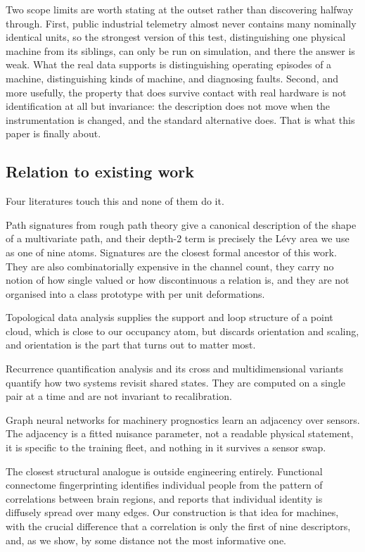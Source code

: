 \documentclass[11pt]{article}
\begin{document}
Two scope limits are worth stating at the outset rather than discovering
halfway through. First, public industrial telemetry almost never contains many
nominally identical units, so the strongest version of this test, distinguishing
one physical machine from its siblings, can only be run on simulation, and there
the answer is weak. What the real data supports is distinguishing operating
episodes of a machine, distinguishing kinds of machine, and diagnosing faults.
Second, and more usefully, the property that does survive contact with real
hardware is not identification at all but invariance: the description does not
move when the instrumentation is changed, and the standard alternative does.
That is what this paper is finally about.

\subsection{Relation to existing work}

Four literatures touch this and none of them do it.

Path signatures from rough path theory give a canonical description of the
shape of a multivariate path, and their depth-2 term is precisely the L\'evy
area we use as one of nine atoms. Signatures are the closest formal ancestor
of this work. They are also combinatorially expensive in the channel count,
they carry no notion of how single valued or how discontinuous a relation is,
and they are not organised into a class prototype with per unit deformations.

Topological data analysis supplies the support and loop structure of a point
cloud, which is close to our occupancy atom, but discards orientation and
scaling, and orientation is the part that turns out to matter most.

Recurrence quantification analysis and its cross and multidimensional variants
quantify how two systems revisit shared states. They are computed on a single
pair at a time and are not invariant to recalibration.

Graph neural networks for machinery prognostics learn an adjacency over
sensors. The adjacency is a fitted nuisance parameter, not a readable physical
statement, it is specific to the training fleet, and nothing in it survives a
sensor swap.

The closest structural analogue is outside engineering entirely. Functional
connectome fingerprinting identifies individual people from the pattern of
correlations between brain regions, and reports that individual identity is
diffusely spread over many edges. Our construction is that idea for machines,
with the crucial difference that a correlation is only the first of nine
descriptors, and, as we show, by some distance not the most informative one.
\end{document}

